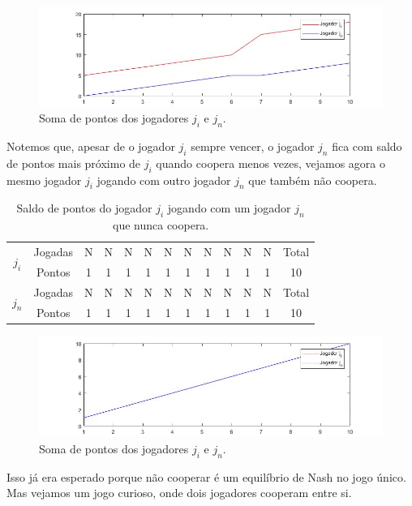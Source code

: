 \begin{figure}[H]
\centering
\includegraphics[width=14cm]{graf2.jpg}
\caption{Soma de pontos dos jogadores $j_i$ e $j_n$.}
\label{fig2}
\end{figure}

Notemos que, apesar de o jogador $j_i$ sempre vencer, o jogador $j_n$ fica com saldo de pontos mais próximo de $j_i$ quando coopera menos vezes, vejamos agora o mesmo jogador $j_i$ jogando com outro jogador $j_n$ que também não coopera.

\begin{table}[H]
\centering
\begin{tabular}{|c|c|c|c|c|c|c|c|c|c|c|c|c|}\hline
\multirow{2}{*}{$j_i$} & Jogadas & N & N & N & N & N & N & N & N &	N &	N & Total\\\cline{2-12}
 & Pontos & 1 & 1 & 1 & 1 & 1 & 1 & 1 & 1 & 1 & 1 & 10\\\hline\hline
\multirow{2}{*}{$j_n$} & Jogadas & N & N & N & N & N & N & N & N &	N &	N & Total\\\cline{2-12}
 & Pontos & 1 & 1 & 1 & 1 & 1 & 1 & 1 & 1 & 1 & 1 & 10\\\hline
\end{tabular}
\caption{Saldo de pontos do jogador $j_i$ jogando com um jogador $j_n$ que nunca coopera.}
\label{tab3}
\end{table}

\begin{figure}[H]
\centering
\includegraphics[width=14cm]{graf3.jpg}
\caption{Soma de pontos dos jogadores $j_i$ e $j_n$.}
\label{fig3}
\end{figure}

Isso já era esperado porque não cooperar é um equilíbrio de Nash no jogo único. Mas vejamos um jogo curioso, onde dois jogadores cooperam entre si.

